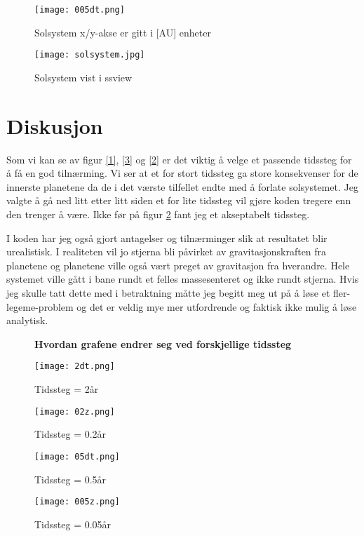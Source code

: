 \documentclass[12pt,preprint]{aastex6}
\begin{document}
\begin{figure}[h!]
\begin{minipage}[b]{0.40\linewidth}
\centering
\texttt{[image: 005dt.png]} 
\caption{Solsystem x/y-akse er gitt i [AU] enheter}
\label{4}
\end{minipage}
\hspace{0.5cm}
\begin{minipage}[b]{0.45\linewidth}
\centering
\texttt{[image: solsystem.jpg]} 
\caption{Solsystem vist i ssview}
\label{6}
\end{minipage}
\end{figure}



\newpage
\section{Diskusjon}
Som vi kan se av figur \ref{1}, \ref{3} og \ref{2} er det viktig å velge et passende tidssteg for å få en god tilnærming. Vi ser at et for stort tidssteg ga store konsekvenser for de innerste planetene da de i det værste tilfellet endte med å forlate solsystemet. Jeg valgte å gå ned litt etter litt siden et for lite tidssteg vil gjøre koden tregere enn den trenger å være. Ikke før på figur \ref{5} fant jeg et akseptabelt tidssteg.

I koden har jeg også gjort antagelser og tilnærminger slik at resultatet blir urealistisk. I realiteten vil jo stjerna bli påvirket av gravitasjonskraften fra planetene og planetene ville også vært preget av gravitasjon fra hverandre. Hele systemet ville gått i bane rundt et felles massesenteret og ikke rundt stjerna. Hvis jeg skulle tatt dette med i betraktning måtte jeg begitt meg ut på å løse et fler-legeme-problem og det er veldig mye mer utfordrende og faktisk ikke mulig å løse analytisk.

\begin{figure}[h!]
\begin{center}
\textbf{Hvordan grafene endrer seg ved forskjellige tidssteg}\par\medskip
\end{center}
\begin{minipage}[b]{0.45\linewidth}
\centering
\texttt{[image: 2dt.png]} 
\caption{Tidssteg = 2år}
\label{1}
\end{minipage}
\hspace{0.5cm}
\begin{minipage}[b]{0.45\linewidth}
\centering
\texttt{[image: 02z.png]} 
\caption{Tidssteg = 0.2år}
\label{3}
\end{minipage}
\begin{minipage}[b]{0.45\linewidth}
\centering
\texttt{[image: 05dt.png]} 
\caption{Tidssteg = 0.5år}
\label{2}
\end{minipage}
\begin{minipage}[b]{0.45\linewidth}
\centering
\texttt{[image: 005z.png]} 
\caption{Tidssteg = 0.05år}
\label{5}
\end{minipage}
\end{figure}
\end{document}
